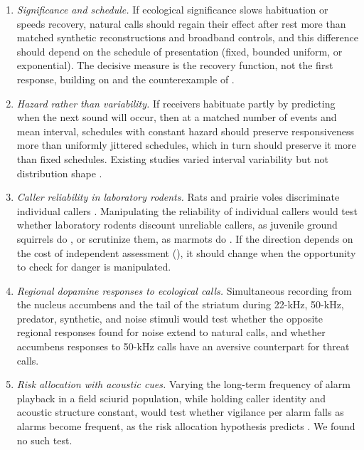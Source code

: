 \begin{enumerate}[leftmargin=*, label=(\arabic*)]
  \item \textit{Significance and schedule.} If ecological significance slows habituation or speeds recovery, natural calls should regain their effect after rest more than matched synthetic reconstructions and broadband controls, and this difference should depend on the schedule of presentation (fixed, bounded uniform, or exponential). The decisive measure is the recovery function, not the first response, building on \citet{EvansHammond1983a} and the counterexample of \citet{BerzEtAl2022}.
  \item \textit{Hazard rather than variability.} If receivers habituate partly by predicting when the next sound will occur, then at a matched number of events and mean interval, schedules with constant hazard should preserve responsiveness more than uniformly jittered schedules, which in turn should preserve it more than fixed schedules. Existing studies varied interval variability but not distribution shape \citep{Davis1970,HerryEtAl2007}.
  \item \textit{Caller reliability in laboratory rodents.} Rats and prairie voles discriminate individual callers \citep{VielleEtAl2021,WarrenEtAl2025}. Manipulating the reliability of individual callers would test whether laboratory rodents discount unreliable callers, as juvenile ground squirrels do \citep{HareAtkins2001}, or scrutinize them, as marmots do \citep{BlumsteinEtAl2004}. If the direction depends on the cost of independent assessment (), it should change when the opportunity to check for danger is manipulated.
  \item \textit{Regional dopamine responses to ecological calls.} Simultaneous recording from the nucleus accumbens and the tail of the striatum during 22-kHz, 50-kHz, predator, synthetic, and noise stimuli would test whether the opposite regional responses found for noise \citep{FuruyamaEtAl2026} extend to natural calls, and whether accumbens responses to 50-kHz calls \citep{WilluhnEtAl2014} have an aversive counterpart for threat calls.
  \item \textit{Risk allocation with acoustic cues.} Varying the long-term frequency of alarm playback in a field sciurid population, while holding caller identity and acoustic structure constant, would test whether vigilance per alarm falls as alarms become frequent, as the risk allocation hypothesis predicts \citep{LimaBednekoff1999}. We found no such test.

\end{enumerate}
